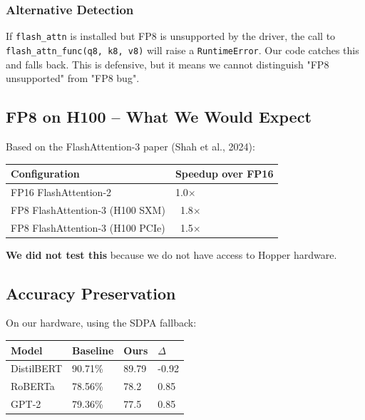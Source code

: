 \subsubsection{Alternative Detection}

If \texttt{flash\_attn} is installed but FP8 is unsupported by the driver, the call 
to \texttt{flash\_attn\_func(q8, k8, v8)} will raise a \texttt{RuntimeError}. Our code 
catches this and falls back. This is defensive, but it means we cannot 
distinguish "FP8 unsupported" from "FP8 bug".

\subsection{FP8 on H100 -- What We Would Expect}

Based on the FlashAttention-3 paper (Shah et al., 2024):

\begin{table}[H]
\centering
\small
\begin{tabular}{ll}
\toprule
\textbf{Configuration} & \textbf{Speedup over FP16} \\
\midrule
FP16 FlashAttention-2 & 1.0$\times$ \\
FP8 FlashAttention-3 (H100 SXM) & ~1.8$\times$ \\
FP8 FlashAttention-3 (H100 PCIe) & ~1.5$\times$ \\
\bottomrule
\end{tabular}
\end{table}

\textbf{We did not test this} because we do not have access to Hopper hardware.

\subsection{Accuracy Preservation}

On our hardware, using the SDPA fallback:

\begin{table}[H]
\centering
\small
\begin{tabular}{llll}
\toprule
\textbf{Model} & \textbf{Baseline} & \textbf{Ours} & \textbf{$\Delta$} \\
\midrule
DistilBERT & 90.71\% & 89.79 & -0.92 \\
RoBERTa & 78.56\% & 78.2 & 0.85 \\
GPT-2 & 79.36\% & 77.5 & 0.85 \\
\bottomrule
\end{tabular}
\end{table}

